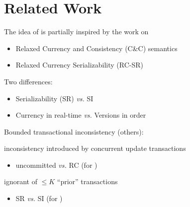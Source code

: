 \section{Related Work}

\begin{frame}{}
  The idea of  is partially inspired by the work on 
  \begin{itemize}
    \item Relaxed Currency and Consistency (C\&C) semantics 
    \item Relaxed Currency Serializability (RC-SR) 
  \end{itemize}

  \vspace{0.80cm}
  Two differences:
  \begin{itemize}
    \item Serializability (SR) \emph{vs.} SI
    \item Currency in real-time \emph{vs.} Versions in order
  \end{itemize}
\end{frame}

\begin{frame}{}
  Bounded transactional inconsistency (others):
  \begin{description}
    \setlength{\itemsep}{8pt}
    \item[Epsilon-SR] inconsistency introduced by concurrent update transactions
       
      \begin{itemize}
	\item uncommitted \emph{vs.} RC (for \rvsi{})
      \end{itemize}
    \item[$N$-ignorant System] ignorant of $\le K$ ``prior'' transactions
      \begin{itemize}
	\item SR \emph{vs.} SI (for \rvsi{})
      \end{itemize}
  \end{description}
\end{frame}

